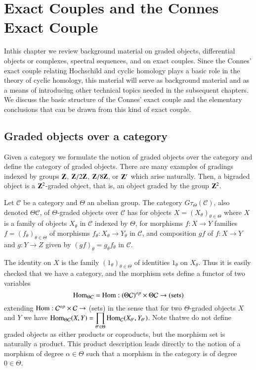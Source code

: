 \chapter{Exact Couples and the Connes Exact Couple}\label{chap1}

In\pageoriginale this chapter we review background material on graded
objects, differential objects or complexes, spectral sequences, and on
exact couples. Since the Connes' exact couple relating Hochschild and
cyclic homology plays a basic role in the theory of cyclic homology,
this material will serve as background material and as a means of
introducing other technical topics needed in the subsequent
chapters. We discuss the basic structure of the Connes' exact couple
and the elementary conclusions that can be drawn from this kind of
exact couple.

\section{Graded objects over a
  category}\label{chap1-sec1}

Given a category we formulate the notion of graded objects over the
category and define the category of graded objects. There are many
examples of gradings indexed by groups $\mathbf{Z}$, $\mathbf{Z}/2\mathbf{Z}$,
$\mathbf{Z}/8\mathbf{Z}$, or $\mathbf{Z}^{r}$ which arise naturally. Then, a bigraded
object is a $\mathbf{Z}^{2}$-graded object, that is, an object graded by the
group $\mathbf{Z}^{2}$. 

\begin{definition}\label{chap1-defi1.1}
Let $\mathcal{C}$ be a category and $\Theta$ an abelian group. The
category $G\tau_{\Theta}(\mathcal{C})$, also denoted $\Theta\mathcal{C}$,
of $\Theta$-graded objects over $\mathcal{C}$ has for objects
$X=(X_{\theta})_{\theta\in \Theta}$ where $X$ is a family of objects
$X_{\theta}$ in $\mathcal{C}$ indexed by $\Theta$, for morphisms
$f:X\to Y$ families $f=(f_{\theta})_{\theta\in \Theta}$ of morphisms
$f_{\theta}:X_{\theta}\to Y_{\theta}$ in $\mathcal{C}$, and
composition $gf$ of $f:X\to Y$ and $g:Y\to Z$ given by
$(gf)_{\theta}=g_{\theta}f_{\theta}$ in $\mathcal{C}$. 
\end{definition}

The identity on $X$ is the family $(1_{\theta})_{\theta\in \Theta}$ of
identities $1_{\theta}$ on $X_{\theta}$. Thus it is easily checked
that we have a category, and the morphism sets define a functor of two
variables 
$$
\operatorname{Hom}_{\Theta\mathcal{C}}=\operatorname{Hom}:(\Theta\mathcal{C})^{op}\times
\Theta\mathcal{C}\to \text{(sets)}
$$
extending $\operatorname{Hom}:\mathcal{C}^{op}\times \mathcal{C}\to$ (sets) in the
sense that for two $\Theta$-graded objects $X$ and $Y$ we have
$\operatorname{Hom}_{\Theta\mathcal{C}}(X,Y)=\displaystyle{\prod_{\theta'\in\Theta}}\operatorname{Hom}_{\mathcal{C}}(X_{\theta'},Y_{\theta'})$. Note 
that\pageoriginale we do not define graded objects as either products
or coproducts, but the morphism set is naturally a product. This
product description leads directly to the notion of a morphism of
degree $\alpha\in \Theta$ such that a morphism in the category is of
degree $0\in\Theta$.

